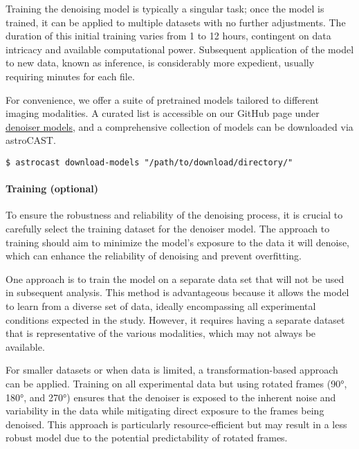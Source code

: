 Training the denoising model is typically a singular task; once the model is trained, it can be applied to multiple datasets with no further adjustments. The duration of this initial training varies from 1 to 12 hours, contingent on data intricacy and available computational power. Subsequent application of the model to new data, known as inference, is considerably more expedient, usually requiring minutes for each file.

For convenience, we offer a suite of pretrained models tailored to different imaging modalities. A curated list is accessible on our GitHub page under \href{https://github.com/janreising/astroCAST/tree/main/denoiser_models}{denoiser models}, and a comprehensive collection of models can be downloaded via astroCAST.

\begin{lstlisting}[style=bashStyle]
    $ astrocast download-models "/path/to/download/directory/"
\end{lstlisting}


\paragraph{Training (optional)}

To ensure the robustness and reliability of the denoising process, it is crucial to carefully select the training dataset for the denoiser model. The approach to training should aim to minimize the model's exposure to the data it will denoise, which can enhance the reliability of denoising and prevent overfitting.

One approach is to train the model on a separate data set that will not be used in subsequent analysis. This method is advantageous because it allows the model to learn from a diverse set of data, ideally encompassing all experimental conditions expected in the study. However, it requires having a separate dataset that is representative of the various modalities, which may not always be available.

For smaller datasets or when data is limited, a transformation-based approach can be applied. Training on all experimental data but using rotated frames (90°, 180°, and 270°) ensures that the denoiser is exposed to the inherent noise and variability in the data while mitigating direct exposure to the frames being denoised. This approach is particularly resource-efficient but may result in a less robust model due to the potential predictability of rotated frames.

